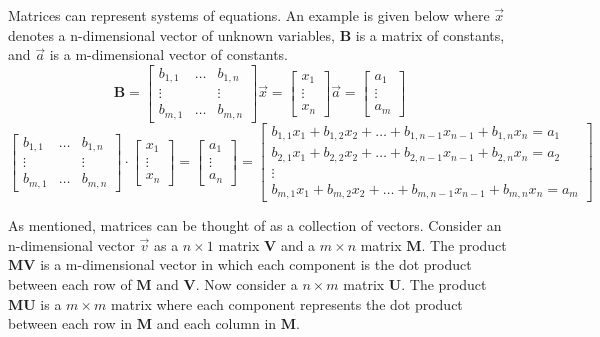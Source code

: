 \documentclass[12pt]{article}
\begin{document}
Matrices can represent systems of equations. An example is given below where $\vec{x}$ denotes a n-dimensional vector of unknown variables, $\mathbf{B}$ is a matrix of constants, and $\vec{a}$ is a m-dimensional vector of constants. 
\[
\mathbf{B} = 
\begin{bmatrix}
  b_{1,1} & \ldots & b_{1,n} \\
  \vdots &  & \vdots \\
  b_{m,1} & \ldots & b_{m,n}
 \end{bmatrix}
 \vec{x} = 
 \begin{bmatrix}
 x_{1} \\
 \vdots \\
 x_{n}
 \end{bmatrix}
 \vec{a} = 
 \begin{bmatrix}
 a_{1} \\
 \vdots \\
 a_{m}
 \end{bmatrix}
\]
\[
\begin{bmatrix}
  b_{1,1} & \ldots & b_{1,n} \\
  \vdots &  & \vdots \\
  b_{m,1} & \ldots & b_{m,n}
 \end{bmatrix}
\cdot
 \begin{bmatrix}
 x_{1} \\
 \vdots \\
 x_{n}
 \end{bmatrix}
 = 
 \begin{bmatrix}
 a_{1} \\
 \vdots \\
 a_{n}
 \end{bmatrix}
 =
 \begin{bmatrix}
 b_{1,1} x_{1} + b_{1,2} x_{2} + \ldots + b_{1,n-1} x_{n-1} + b_{1,n} x_{n} = a_{1}\\
  b_{2,1} x_{1} + b_{2,2} x_{2} + \ldots + b_{2,n-1} x_{n-1} + b_{2,n} x_{n} = a_{2} \\
  \vdots \\
   b_{m,1} x_{1} + b_{m,2} x_{2} + \ldots + b_{m,n-1} x_{n-1} + b_{m,n} x_{n} = a_{m}
 \end{bmatrix}
 \]

As mentioned, matrices can be thought of as a collection of vectors. Consider an n-dimensional vector $\vec{v}$ as a $n\times1$ matrix $\mathbf{V}$ and a $m\times n$ matrix $\mathbf{M}$. The product $\mathbf{M}\mathbf{V}$ is a m-dimensional vector in which each component is the dot product between each row of $\mathbf{M}$ and $\mathbf{V}$. Now consider a $n\times m$ matrix $\mathbf{U}$. The product $\mathbf{M}\mathbf{U}$ is a $m\times m$ matrix where each component represents the dot product between each row in $\mathbf{M}$ and each column in $\mathbf{M}$. \\
\end{document}
